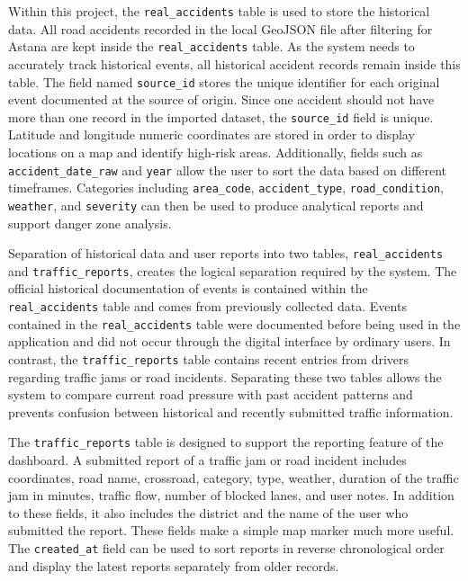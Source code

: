 ﻿\documentclass[12pt,a4paper]{report}
\begin{document}
Within this project, the \texttt{real\_accidents} table is used to store the historical data. All road accidents recorded in the local GeoJSON file after filtering for Astana are kept inside the \texttt{real\_accidents} table. As the system needs to accurately track historical events, all historical accident records remain inside this table. The field named \texttt{source\_id} stores the unique identifier for each original event documented at the source of origin. Since one accident should not have more than one record in the imported dataset, the \texttt{source\_id} field is unique. Latitude and longitude numeric coordinates are stored in order to display locations on a map and identify high-risk areas. Additionally, fields such as \texttt{accident\_date\_raw} and \texttt{year} allow the user to sort the data based on different timeframes. Categories including \texttt{area\_code}, \texttt{accident\_type}, \texttt{road\_condition}, \texttt{weather}, and \texttt{severity} can then be used to produce analytical reports and support danger zone analysis.

Separation of historical data and user reports into two tables, \texttt{real\_accidents} and \texttt{traffic\_reports}, creates the logical separation required by the system. The official historical documentation of events is contained within the \texttt{real\_accidents} table and comes from previously collected data. Events contained in the \texttt{real\_accidents} table were documented before being used in the application and did not occur through the digital interface by ordinary users. In contrast, the \texttt{traffic\_reports} table contains recent entries from drivers regarding traffic jams or road incidents. Separating these two tables allows the system to compare current road pressure with past accident patterns and prevents confusion between historical and recently submitted traffic information.

The \texttt{traffic\_reports} table is designed to support the reporting feature of the dashboard. A submitted report of a traffic jam or road incident includes coordinates, road name, crossroad, category, type, weather, duration of the traffic jam in minutes, traffic flow, number of blocked lanes, and user notes. In addition to these fields, it also includes the district and the name of the user who submitted the report. These fields make a simple map marker much more useful. The \texttt{created\_at} field can be used to sort reports in reverse chronological order and display the latest reports separately from older records.
\end{document}
